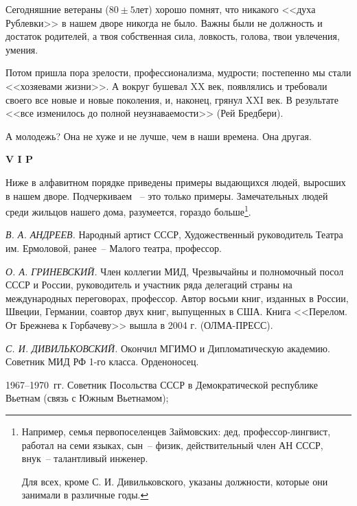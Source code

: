\newpage

Сегодняшние ветераны ($80\pm5$лет) хорошо помнят, что никакого <<духа Рублевки>> в нашем дворе никогда не было. Важны были не должность и достаток родителей, а твоя собственная сила, ловкость, голова, твои увлечения, умения.

Потом пришла пора зрелости, профессионализма, мудрости; постепенно мы стали <<хозяевами жизни>>. А вокруг бушевал XX век, появлялись и требовали своего все новые и новые поколения, и, наконец, грянул XXI век. В результате <<все изменилось до полной неузнаваемости>> (Рей Бредбери).

А молодежь? Она не хуже и не лучше, чем в наши времена. Она другая.

\vspace{10pt}

\begin{center}
\textbf{\Large V I P}
\end{center}

\vspace{-10pt}

Ниже в алфавитном порядке приведены примеры выдающихся людей, выросших в нашем дворе. Подчеркиваем ~-- это только примеры. Замечательных людей среди жильцов нашего дома, разумеется, гораздо больше\footnote{Например, семья первопоселенцев Займовских: дед, профессор-лингвист, работал на семи языках, сын~-- физик, действительный член АН СССР, внук~-- талантливый инженер. 

Для всех, кроме С. И. Дивильковского, указаны должности, которые они занимали в различные годы.}.

\indent

\textit{В. А. АНДРЕЕВ.} Народный артист СССР, Художественный руководитель Театра им. Ермоловой, ранее~-- Малого театра, профессор.

\indent

\textit{О. А. ГРИНЕВСКИЙ.} Член коллегии МИД, Чрезвычайны и полномочный посол СССР и России, руководитель и участник ряда делегаций страны на международных переговорах, профессор. Автор восьми книг, изданных в России, Швеции, Германии, соавтор двух книг, выпущенных в США. Книга <<Перелом. От Брежнева к Горбачеву>> вышла в 2004 г. (ОЛМА-ПРЕСС).

\indent

\textit{С. И. ДИВИЛЬКОВСКИЙ.} Окончил МГИМО и Дипломатическую академию. Советник МИД РФ 1-го класса. Орденоносец.

1967--1970~гг. Советник Посольства СССР в Демократической республике Вьетнам (связь с Южным Вьетнамом);

